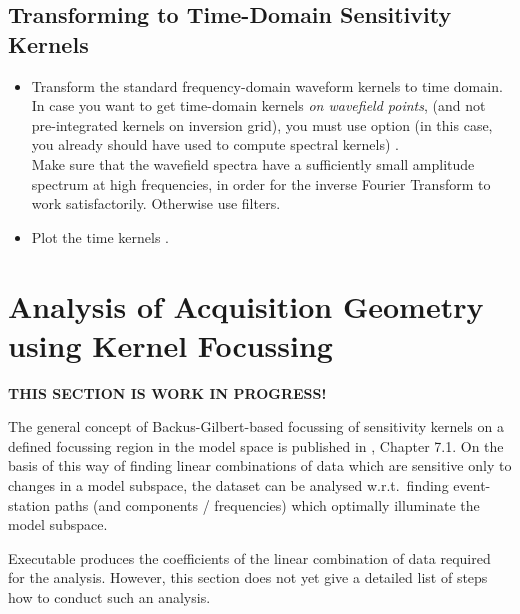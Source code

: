 \subsection*{Transforming to Time-Domain Sensitivity Kernels}
%
\begin{itemize}
\item Transform the standard frequency-domain waveform kernels to time domain. In case you want to get  
  time-domain kernels \emph{on wavefield points}, (and not pre-integrated kernels on inversion grid),
  you must use option  (in this case, you already should have used  to compute 
  spectral kernels) .\\
  Make sure that the wavefield spectra have a sufficiently small amplitude spectrum at high frequencies, in order for the
  inverse Fourier Transform to work satisfactorily. Otherwise use filters.
%
\item Plot the time kernels .
\end{itemize}
%
\newpage
\section*{Analysis of Acquisition Geometry using Kernel Focussing} \label{guide,sec:acq_ana_focus}
{}
%
{\bf THIS SECTION IS WORK IN PROGRESS!}

The general concept of Backus-Gilbert-based focussing of sensitivity kernels on a defined focussing region 
in the model space is published in \cite{_743d334d-dfa4-4a16-8cc5-91cdadc95271}, Chapter 7.1. On the basis
of this way of finding linear combinations of data which are sensitive only to changes in a model subspace, 
the dataset can be analysed w.r.t.\ finding event-station paths (and components / frequencies) which optimally
illuminate the model subspace. 

Executable   produces the coefficients of the linear combination of data required
for the analysis. However, this section does not yet give a detailed list of steps how to conduct such 
an analysis. 

